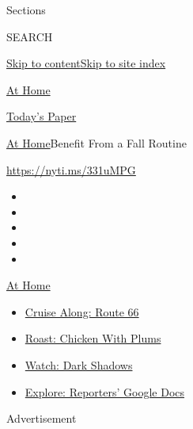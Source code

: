 Sections

SEARCH

\protect\hyperlink{site-content}{Skip to
content}\protect\hyperlink{site-index}{Skip to site index}

\href{https://www.nytimes3xbfgragh.onion/spotlight/at-home}{At Home}

\href{https://myaccount.nytimes3xbfgragh.onion/auth/login?response_type=cookie\&client_id=vi}{}

\href{https://www.nytimes3xbfgragh.onion/section/todayspaper}{Today's
Paper}

\href{/spotlight/at-home}{At Home}\textbar{}Benefit From a Fall Routine

\url{https://nyti.ms/331uMPG}

\begin{itemize}
\item
\item
\item
\item
\item
\end{itemize}

\href{https://www.nytimes3xbfgragh.onion/spotlight/at-home?action=click\&pgtype=Article\&state=default\&region=TOP_BANNER\&context=at_home_menu}{At
Home}

\begin{itemize}
\tightlist
\item
  \href{https://www.nytimes3xbfgragh.onion/2020/09/07/travel/route-66.html?action=click\&pgtype=Article\&state=default\&region=TOP_BANNER\&context=at_home_menu}{Cruise
  Along: Route 66}
\item
  \href{https://www.nytimes3xbfgragh.onion/2020/09/04/dining/sheet-pan-chicken.html?action=click\&pgtype=Article\&state=default\&region=TOP_BANNER\&context=at_home_menu}{Roast:
  Chicken With Plums}
\item
  \href{https://www.nytimes3xbfgragh.onion/2020/09/04/arts/television/dark-shadows-stream.html?action=click\&pgtype=Article\&state=default\&region=TOP_BANNER\&context=at_home_menu}{Watch:
  Dark Shadows}
\item
  \href{https://www.nytimes3xbfgragh.onion/interactive/2020/at-home/even-more-reporters-editors-diaries-lists-recommendations.html?action=click\&pgtype=Article\&state=default\&region=TOP_BANNER\&context=at_home_menu}{Explore:
  Reporters' Google Docs}
\end{itemize}

Advertisement

